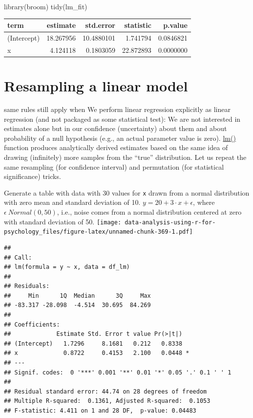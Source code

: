 \documentclass[
]{book}
\newenvironment{Shaded}{\begin{snugshade}}{\end{snugshade}}
\newcommand{\FunctionTok}[1]{\textcolor[rgb]{0.00,0.00,0.00}{#1}}
\newcommand{\NormalTok}[1]{#1}
\begin{document}
\begin{Shaded}
\begin{Highlighting}[]
\FunctionTok{library}\NormalTok{(broom)}
\FunctionTok{tidy}\NormalTok{(lm\_fit)}
\end{Highlighting}
\end{Shaded}

\begin{tabular}{l|r|r|r|r}
\hline
term & estimate & std.error & statistic & p.value\\
\hline
(Intercept) & 18.267956 & 10.4880101 & 1.741794 & 0.0846821\\
\hline
x & 4.124118 & 0.1803059 & 22.872893 & 0.0000000\\
\hline
\end{tabular}

\hypertarget{resampling-a-linear-model}{%
\section{Resampling a linear model}\label{resampling-a-linear-model}}

same rules still apply when We perform linear regression explicitly as linear regression (and not packaged as some statistical test): We are not interested in estimates alone but in our confidence (uncertainty) about them and about probability of a null hypothesis (e.g., an actual parameter value is zero). \href{https://stat.ethz.ch/R-manual/R-devel/library/stats/html/lm.html}{lm()} function produces analytically derived estimates based on the same idea of drawing (infinitely) more samples from the ``true'' distribution. Let us repeat the same resampling (for confidence interval) and permutation (for statistical significance) tricks.

Generate a table with data with 30 values for \texttt{x} drawn from a normal distribution with zero mean and standard deviation of 10. \(y = 20 +3 \cdot x + \epsilon\), where \(\epsilon ~ Normal(0, 50)\), i.e., noise comes from a normal distribution centered at zero with standard deviation of 50.
\texttt{[image: data-analysis-using-r-for-psychology\_files/figure-latex/unnamed-chunk-369-1.pdf]}

\begin{verbatim}
## 
## Call:
## lm(formula = y ~ x, data = df_lm)
## 
## Residuals:
##     Min      1Q  Median      3Q     Max 
## -83.317 -28.098  -4.514  30.695  84.269 
## 
## Coefficients:
##             Estimate Std. Error t value Pr(>|t|)  
## (Intercept)   1.7296     8.1681   0.212   0.8338  
## x             0.8722     0.4153   2.100   0.0448 *
## ---
## Signif. codes:  0 '***' 0.001 '**' 0.01 '*' 0.05 '.' 0.1 ' ' 1
## 
## Residual standard error: 44.74 on 28 degrees of freedom
## Multiple R-squared:  0.1361, Adjusted R-squared:  0.1053 
## F-statistic: 4.411 on 1 and 28 DF,  p-value: 0.04483
\end{verbatim}
\end{document}
